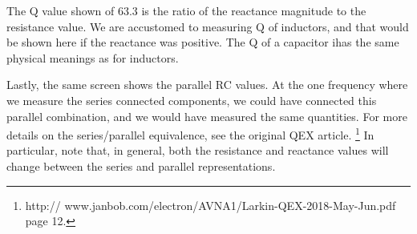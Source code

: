 The Q value shown of 63.3 is the ratio of the reactance magnitude to the resistance value.  We are accustomed to measuring Q of inductors, and that would be shown here if the reactance was positive.  The Q of a capacitor ihas the same physical meanings as for inductors.

Lastly, the same screen shows the parallel RC values.
At the one frequency where we measure the series connected components, we could have connected this parallel combination, and we would have measured the same quantities.
For more details on the series/parallel equivalence, see the original QEX article.
%
\footnote{http:// www.janbob.com/electron/AVNA1/Larkin-QEX-2018-May-Jun.pdf page 12.}
%
In particular, note that, in general, both the resistance and reactance values will change between the series and parallel representations.

